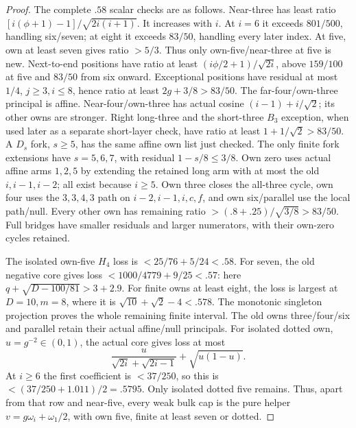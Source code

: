 \documentclass[11pt]{article}
\theoremstyle{definition}
\theoremstyle{remark}
\begin{document}
\begin{proof}
The complete $.58$ scalar checks are as follows. Near-three has
least ratio $[i(\phi+1)-1]/\sqrt{2i(i+1)}$. It increases with $i$.
At $i=6$ it exceeds $801/500$, handling six/seven; at eight it
exceeds $83/50$, handling every later index. At five, own at least
seven gives ratio $>5/3$. Thus only own-five/near-three at five is
new. Next-to-end positions have ratio at least
$(i\phi/2+1)/\sqrt{2i}$, above $159/100$ at five and $83/50$
from six onward. Exceptional positions have residual at most $1/4$,
$j\ge3,i\le8$, hence ratio at least $2g+3/8>83/50$.
The far-four/own-three principal is affine. Near-four/own-three
has actual cosine $(i-1)+i/\sqrt2$; its other owns are stronger.
Right long-three and the short-three $B_3$ exception, when used
later as a separate short-layer check, have ratio
at least $1+1/\sqrt2>83/50$. A $D_s$ fork, $s\ge5$, has the
same affine own list just checked. The only finite fork extensions
have $s=5,6,7$, with residual $1-s/8\le3/8$.
Own zero uses actual affine arms $1,2,5$ by extending the retained
long arm with at most the old $i,i-1,i-2$; all exist because $i\ge5$.
Own three closes the all-three cycle, own four uses the
$3,3,4,3$ path on $i-2,i-1,i,c,f$, and own six/parallel use
the local path/null. Every other own has remaining ratio
$>(.8+.25)/\sqrt{3/8}>83/50$. Full bridges have smaller residuals
and larger numerators, with their own-zero cycles retained.

The isolated own-five $H_4$ loss is $<25/76+5/24<.58$.
For seven, the old negative core gives loss
$<1000/4779+9/25<.57$: here $q+\sqrt{D-100/81}>3+2.9$.
For finite owns at least eight, the loss is largest at $D=10,m=8$,
where it is $\sqrt{10}+\sqrt2-4<.578$. The monotonic singleton
projection proves the whole remaining finite interval. The old
owns three/four/six and parallel retain their actual affine/null
principals. For isolated dotted own, $u=g^{-2}\in(0,1)$, the
actual core gives loss at most
\[
 {\frac{u}{\sqrt{2i}+\sqrt{2i-1}}}+\sqrt{u(1-u)}.
\]
At $i\ge6$ the first coefficient is $<37/250$, so this is
$<(37/250+1.011)/2=.5795$. Only isolated dotted five remains.
Thus, apart from that row and near-five, every weak bulk cap is
the pure helper $v=g\omega_i+\omega_1/2$, with own five, finite
at least seven or dotted.


\end{proof}
\end{document}
